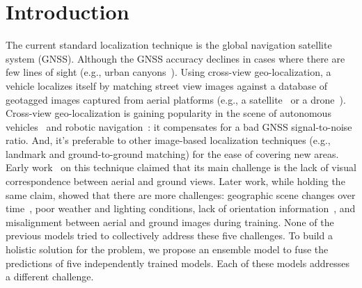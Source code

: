 \documentclass[10pt,letterpaper]{article}
\begin{document}
\linenumbers

\section*{Introduction}
The current standard localization technique is the global navigation satellite system (GNSS). Although the GNSS accuracy declines in cases where there are few lines of sight (e.g., urban canyons~\cite{bib1}). Using cross-view geo-localization, a vehicle localizes itself by matching street view images against a database of geotagged images captured from aerial platforms (e.g., a satellite~\cite{bib2} or a drone~\cite{bib3}). Cross-view geo-localization is gaining popularity in the scene of autonomous vehicles~\cite{bib2} and robotic navigation~\cite{bib25}: it compensates for a bad GNSS signal-to-noise ratio. And,  it’s preferable to other image-based localization techniques (e.g., landmark and ground-to-ground matching) for the ease of covering new areas. Early work~\cite{bib37} on this technique claimed that its main challenge is the lack of visual correspondence between aerial and ground views. Later work, while holding the same claim, showed that there are more challenges: geographic scene changes over time~\cite{bib6,bib7,bib8,bib9,bib10}, poor weather and lighting conditions, lack of orientation information~\cite{bib4}, and misalignment between aerial and ground images during training.
None of the previous models tried to collectively address these five challenges. To build a holistic solution for the problem, we propose an ensemble model to fuse the predictions of five independently trained models. Each of these models addresses a different challenge.
\end{document}
